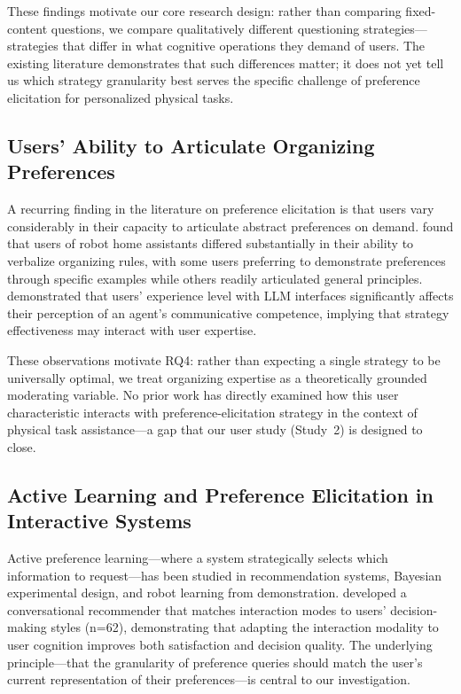 \documentclass[a4paper,fleqn]{cas-sc}
\begin{document}
These findings motivate our core research design: rather than comparing fixed-content questions, we compare qualitatively different questioning strategies---strategies that differ in what cognitive operations they demand of users. The existing literature demonstrates that such differences matter; it does not yet tell us which strategy granularity best serves the specific challenge of preference elicitation for personalized physical tasks.

\subsection{Users' Ability to Articulate Organizing Preferences}

A recurring finding in the literature on preference elicitation is that users vary considerably in their capacity to articulate abstract preferences on demand. \citet{ajaykumar2023older} found that users of robot home assistants differed substantially in their ability to verbalize organizing rules, with some users preferring to demonstrate preferences through specific examples while others readily articulated general principles. \citet{skjuve2025chatgpt} demonstrated that users' experience level with LLM interfaces significantly affects their perception of an agent's communicative competence, implying that strategy effectiveness may interact with user expertise.

These observations motivate RQ4: rather than expecting a single strategy to be universally optimal, we treat organizing expertise as a theoretically grounded moderating variable. No prior work has directly examined how this user characteristic interacts with preference-elicitation strategy in the context of physical task assistance---a gap that our user study (Study~2) is designed to close.

\subsection{Active Learning and Preference Elicitation in Interactive Systems}

Active preference learning---where a system strategically selects which information to request---has been studied in recommendation systems, Bayesian experimental design, and robot learning from demonstration. \citet{shin2025toward} developed a conversational recommender that matches interaction modes to users' decision-making styles (n=62), demonstrating that adapting the interaction modality to user cognition improves both satisfaction and decision quality. The underlying principle---that the granularity of preference queries should match the user's current representation of their preferences---is central to our investigation.
\end{document}

